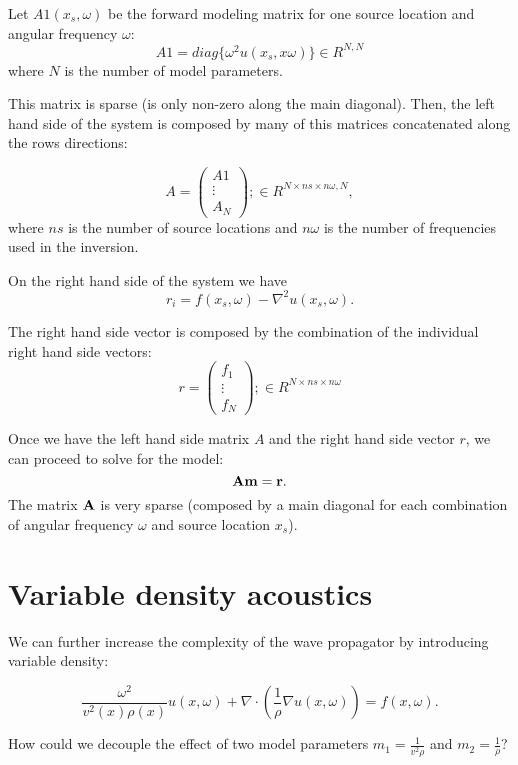 \documentclass[10pt]{article}
\begin{document}
Let $A1(x_s,\omega)$ be the forward
 modeling matrix for one source location and angular frequency $\omega$:
\[
  A1 = diag\{\omega^2 u(x_s,x\omega)\} \in R^{N,N} 
\]
where $N$ is the number of model parameters.

This matrix is sparse (is only non-zero along the main diagonal).
Then, the left hand side of the system is composed by many of this 
matrices concatenated along the rows directions:

\[
 A = 
 \begin{pmatrix}
  A1     \\
  \vdots  \\
  A_N    
 \end{pmatrix};
\in R^{N\times ns \times n\omega,N},
\]
where $ns$ is the number of source locations and $n\omega$ is the number
of frequencies used in the inversion.

On the right hand side of the system we have 
\[
 r_i = f(x_s,\omega) -\nabla^2 u(x_s,\omega).
\]

The right hand side vector is composed by the combination of the individual
right hand side vectors:
\[
 r = 
 \begin{pmatrix}
  f_1     \\
  \vdots  \\
  f_N    
 \end{pmatrix};
\in R^{N\times ns \times n\omega}
\]

Once we have the left hand side matrix $A$ and the right hand side vector $r$, 
we can proceed to solve for the model:
\[
 {\bf A }{\bf m} = \bf r.
\]
The matrix $\bf A$ is very sparse (composed by a main diagonal  for each combination
of angular frequency $\omega$ and source location $x_s$).


\section{Variable density acoustics}

We can further increase the complexity of the wave propagator by introducing variable density: 

\begin{equation}
  \frac{\omega^2 }{v^2(x) \rho(x)} u(x,\omega) +\nabla \cdot(\frac{1}{\rho} \nabla u(x,\omega)) = f(x,\omega).
  \label{eq:vden}
\end{equation}

How could we decouple the effect of two model parameters $m_1 = \frac{1}{v^2\rho}$ and $m_2 = \frac{1}{\rho}$?
\end{document}
